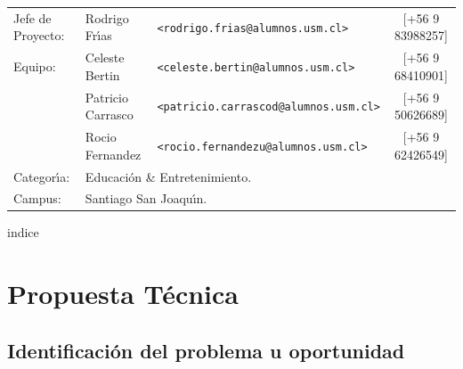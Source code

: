\documentclass[letterpaper,12pt]{report} %
\numberwithin{equation}{section} %
\numberwithin{figure}{section} %
\numberwithin{table}{section} %
\begin{document}
\begin{titlepage}
\vfill
\begin{flushleft} %
\begin{table}[hb]
  \begin{tabular}{lllc}
    Jefe de Proyecto: & Rodrigo Fr\'{\i}as & \texttt{\small <rodrigo.frias@alumnos.usm.cl>} & [+56 9 83988257] \\
    Equipo: & Celeste Bertin & \texttt{\small <celeste.bertin@alumnos.usm.cl>} &[+56 9 68410901]\\
    & Patricio Carrasco &\texttt{\small <patricio.carrascod@alumnos.usm.cl>} &[+56 9 50626689]\\
    & Rocio Fernandez &\texttt{\small <rocio.fernandezu@alumnos.usm.cl>} &[+56 9 62426549]\\
    Categor\'{\i}a: & \multicolumn{3}{l}{Educaci\'on \& Entretenimiento.}\\
    Campus: & \multicolumn{3}{l}{Santiago San Joaqu\'{\i}n.}
  \end{tabular}
\end{table}
\end{flushleft}
\end{titlepage}


\setcounter{page}{1} %

\tableofcontents indice
\newpage

\chapter*{Propuesta T\'ecnica}
\newpage
\section{Identificaci\'on del problema u oportunidad}

\newpage
\end{document}

